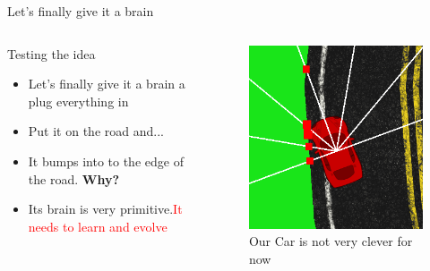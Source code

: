 \documentclass{beamer}
\begin{document}
\begin{frame}{Let's finally give it a brain}
    \begin{columns}
        \column{.6\textheight}
        \begin{block}{Testing the idea}
            \begin{itemize}
                \item Let's finally give it a brain a plug everything in
                \item Put it on the road and...
                \item It bumps into to the edge of the road. \textbf{Why?}
                \item Its brain is very primitive.\textcolor{red}{It needs to learn and evolve} 
            \end{itemize} 
        \end{block}
      
        \column{.4\textheight}
         \begin{figure}
            \includegraphics[width=1.0\linewidth]{cardump.png}
            \caption{\tiny Our Car is not very clever for now}
        \end{figure}
    \end{columns}
\end{frame}
\end{document}
